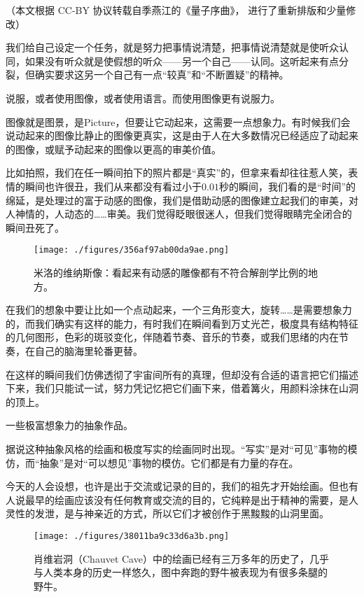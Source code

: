 
（本文根据 CC-BY 协议转载自季燕江的《量子序曲》， 进行了重新排版和少量修改）

我们给自己设定一个任务，就是努力把事情说清楚，把事情说清楚就是使听众认同，如果没有听众就是使假想的听众——另一个自己——认同。这听起来有点分裂，但确实要求这另一个自己有一点“较真”和“不断置疑”的精神。

说服，或者使用图像，或者使用语言。而使用图像更有说服力。

图像就是图景，是Picture，但要让它动起来，这需要一点想象力。有时候我们会说动起来的图像比静止的图像更真实，这是由于人在大多数情况已经适应了动起来的图像，或赋予动起来的图像以更高的审美价值。

比如拍照，我们在任一瞬间拍下的照片都是“真实”的，但拿来看却往往惹人笑，表情的瞬间也许很丑，我们从来都没有看过小于$0.01$秒的瞬间，我们看的是“时间”的绵延，是处理过的富于动感的图像，我们是借助动感的图像建立起我们的审美，对人神情的，人动态的……审美。我们觉得眨眼很迷人，但我们觉得眼睛完全闭合的瞬间丑死了。

\begin{figure}[ht]
\centering
\texttt{[image: ./figures/356af97ab00da9ae.png]}
\caption{米洛的维纳斯像：看起来有动感的雕像都有不符合解剖学比例的地方。} \label{fig_QMPre5_1}
\end{figure}

在我们的想象中要让比如一个点动起来，一个三角形变大，旋转……是需要想象力的，而我们确实有这样的能力，有时我们在瞬间看到万丈光芒，极度具有结构特征的几何图形，色彩的斑驳变化，伴随着节奏、音乐的节奏，或我们思绪的内在节奏，在自己的脑海里轮番更替。

在这样的瞬间我们仿佛透彻了宇宙间所有的真理，但却没有合适的语言把它们描述下来，我们只能试一试，努力凭记忆把它们画下来，借着篝火，用颜料涂抹在山洞的顶上。

一些极富想象力的抽象作品。

据说这种抽象风格的绘画和极度写实的绘画同时出现。“写实”是对“可见”事物的模仿，而“抽象”是对“可以想见”事物的模仿。它们都是有力量的存在。

今天的人会设想，也许是出于交流或记录的目的，我们的祖先才开始绘画。但也有人说最早的绘画应该没有任何教育或交流的目的，它纯粹是出于精神的需要，是人灵性的发泄，是与神亲近的方式，所以它们才被创作于黑黢黢的山洞里面。

\begin{figure}[ht]
\centering
\texttt{[image: ./figures/38011ba9c33d6a3b.png]}
\caption{肖维岩洞（Chauvet Cave）中的绘画已经有三万多年的历史了，几乎与人类本身的历史一样悠久，图中奔跑的野牛被表现为有很多条腿的野牛。} \label{fig_QMPre5_2}
\end{figure}

